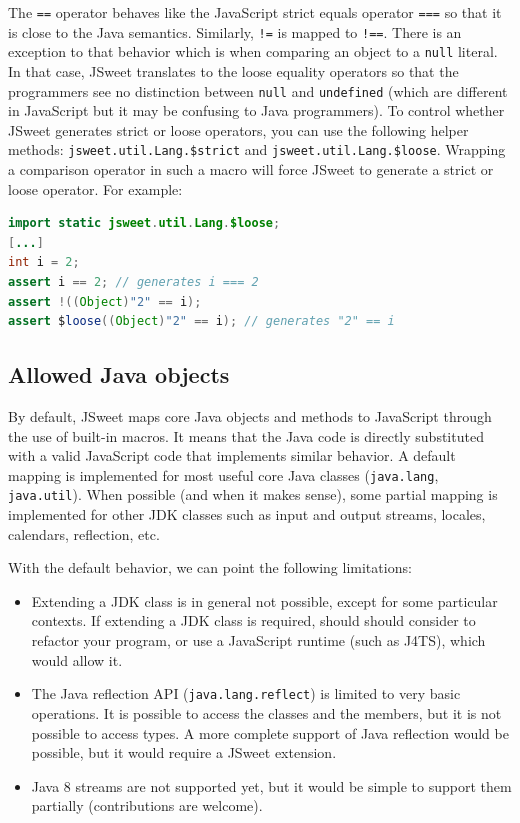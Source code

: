 \documentclass[a4paper]{report}
\begin{document}
The \texttt{==} operator behaves like the JavaScript strict equals operator \texttt{===} so that it is close to the Java semantics. Similarly, \texttt{!=} is mapped to \texttt{!==}. There is an exception to that behavior which is when comparing an object to a \texttt{null} literal. In that case, JSweet translates to the loose equality operators so that the programmers see no distinction between \texttt{null} and \texttt{undefined} (which are different in JavaScript but it may be confusing to Java programmers). To control whether JSweet generates strict or loose operators, you can use the following helper methods: \texttt{jsweet.\-util.\-Lang.\-\$strict} and \texttt{jsweet.\-util.\-Lang.\-\$loose}. Wrapping a comparison operator in such a macro will force JSweet to generate a strict or loose operator. For example:

\begin{lstlisting}[language=Java]
import static jsweet.util.Lang.$loose;
[...]
int i = 2;
assert i == 2; // generates i === 2
assert !((Object)"2" == i);
assert $loose((Object)"2" == i); // generates "2" == i
\end{lstlisting}

\subsection{Allowed Java objects}

By default, JSweet maps core Java objects and methods to JavaScript through the use of built-in macros. It means that the Java code is directly substituted with a valid JavaScript code that implements similar behavior. A default mapping is implemented for most useful core Java classes (\texttt{java.lang}, \texttt{java.util}). When possible (and when it makes sense), some partial mapping is implemented for other JDK classes such as input and output streams, locales, calendars, reflection, etc.

With the default behavior, we can point the following limitations:

\begin{itemize}
\item Extending a JDK class is in general not possible, except for some particular contexts. If extending a JDK class is required, should should consider to refactor your program, or use a JavaScript runtime (such as J4TS), which would allow it.
\item The Java reflection API (\texttt{java.lang.reflect}) is limited to very basic operations. It is possible to access the classes and the members, but it is not possible to access types. A more complete support of Java reflection would be possible, but it would require a JSweet extension.
\item Java 8 streams are not supported yet, but it would be simple to support them partially (contributions are welcome).
\end{itemize}
\end{document}
